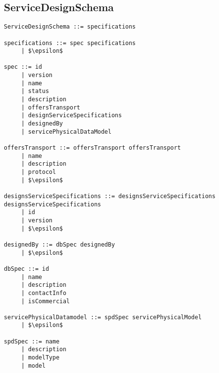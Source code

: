 \subsection{ServiceDesignSchema}
\begin{lstlisting}[mathescape=true, keywordstyle={}]
ServiceDesignSchema ::= specifications

specifications ::= spec specifications
     | $\epsilon$
     
spec ::= id
     | version
     | name
     | status
     | description
     | offersTransport
     | designServiceSpecifications
     | designedBy
     | servicePhysicalDataModel
     
offersTransport ::= offersTransport offersTransport
     | name
     | description
     | protocol
     | $\epsilon$

designsServiceSpecifications ::= designsServiceSpecifications designsServiceSpecifications
     | id
     | version
     | $\epsilon$

designedBy ::= dbSpec designedBy
     | $\epsilon$

dbSpec ::= id
     | name
     | description
     | contactInfo
     | isCommercial

servicePhysicalDatamodel ::= spdSpec servicePhysicalModel
     | $\epsilon$

spdSpec ::= name
     | description
     | modelType
     | model
\end{lstlisting}


